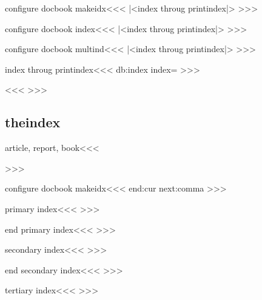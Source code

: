 \<configure docbook makeidx\><<< 
|<index throug printindex|>
>>>


\<configure docbook index\><<< 
|<index throug printindex|>
>>>

\<configure docbook multind\><<< 
|<index throug printindex|>
>>>


\<index throug printindex\><<<
\def\:temp{}
\HLet\printindex\:temp
\expandafter\ifx \csname db:index\endcsname\realx
   \let\db:index=\index
\fi
\def\index{\bgroup
    \HRestore\printindex
    \def\gobble##1{}%
    \gHAdvance\index:N by 1   
    |<index entry|>%
    \leavevmode \let\par=\empty
    \printindex  
   \egroup \db:index}
\def\comNum#1{\tmp:cnt=}
\def\brange#1{\HCode{<remark role="start">}\Link{to-#1}{from-#1}\EndLink
   \HCode{</remark>}}
\def\erange#1{\HCode{<remark role="to">}\Link{from-#1}{to-#1}\EndLink
   \HCode{</remark>}}
>>>



\<\><<<
\def\comNum{%
   \def\:tempa{%
      \ifx ,\:temp        \def\:tempa####1{\tmp:cnt=}%
      \else \ifx {\:temp  \def\:tempa####1{\tmp:cnt=####1}%
            \iffalse }\fi
      \else               \def\:tempa{\tmp:cnt=}%
      \fi\fi \:tempa}%
   \futurelet\:temp\:tempa}
>>>


\subsection{theindex}


\<article, report, book\><<<
    {\special{t4ht@[}}
    {\special{t4ht@]}}
    {}{}{}{}{}{}{}
>>>



\<configure docbook makeidx\><<<
  {\csname end:cur\endcsname {}}
  {%
   \futurelet\:next\remove:comma}
\def\remove:comma{\ifx ,\:next \expandafter\:gobble\fi}
>>>



\<primary index\><<<
%
>>>

\<end primary index\><<<
\hfil\break
>>>

\<secondary index\><<<
%
>>>

\<end secondary index\><<<
\hfil\break
>>>

\<tertiary index\><<<
%
>>>

